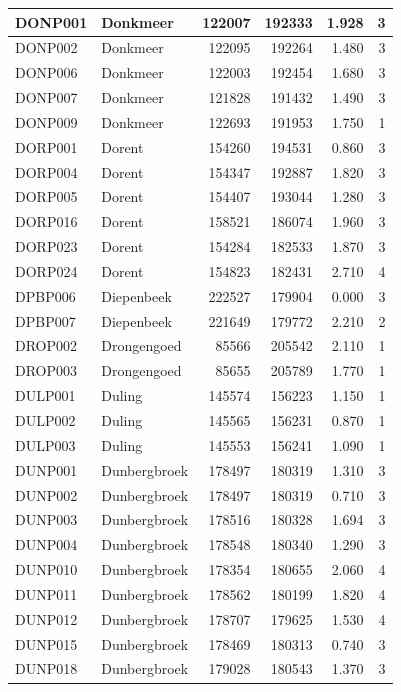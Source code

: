 \documentclass[11pt,]{book}
\begin{document}
\begin{table}
\begin{tabular}[t]{l|l|r|r|r|r}
\hline
DONP001 & Donkmeer & 122007 & 192333 & 1.928 & 3\\
\hline
DONP002 & Donkmeer & 122095 & 192264 & 1.480 & 3\\
\hline
DONP006 & Donkmeer & 122003 & 192454 & 1.680 & 3\\
\hline
DONP007 & Donkmeer & 121828 & 191432 & 1.490 & 3\\
\hline
DONP009 & Donkmeer & 122693 & 191953 & 1.750 & 1\\
\hline
DORP001 & Dorent & 154260 & 194531 & 0.860 & 3\\
\hline
DORP004 & Dorent & 154347 & 192887 & 1.820 & 3\\
\hline
DORP005 & Dorent & 154407 & 193044 & 1.280 & 3\\
\hline
DORP016 & Dorent & 158521 & 186074 & 1.960 & 3\\
\hline
DORP023 & Dorent & 154284 & 182533 & 1.870 & 3\\
\hline
DORP024 & Dorent & 154823 & 182431 & 2.710 & 4\\
\hline
DPBP006 & Diepenbeek & 222527 & 179904 & 0.000 & 3\\
\hline
DPBP007 & Diepenbeek & 221649 & 179772 & 2.210 & 2\\
\hline
DROP002 & Drongengoed & 85566 & 205542 & 2.110 & 1\\
\hline
DROP003 & Drongengoed & 85655 & 205789 & 1.770 & 1\\
\hline
DULP001 & Duling & 145574 & 156223 & 1.150 & 1\\
\hline
DULP002 & Duling & 145565 & 156231 & 0.870 & 1\\
\hline
DULP003 & Duling & 145553 & 156241 & 1.090 & 1\\
\hline
DUNP001 & Dunbergbroek & 178497 & 180319 & 1.310 & 3\\
\hline
DUNP002 & Dunbergbroek & 178497 & 180319 & 0.710 & 3\\
\hline
DUNP003 & Dunbergbroek & 178516 & 180328 & 1.694 & 3\\
\hline
DUNP004 & Dunbergbroek & 178548 & 180340 & 1.290 & 3\\
\hline
DUNP010 & Dunbergbroek & 178354 & 180655 & 2.060 & 4\\
\hline
DUNP011 & Dunbergbroek & 178562 & 180199 & 1.820 & 4\\
\hline
DUNP012 & Dunbergbroek & 178707 & 179625 & 1.530 & 4\\
\hline
DUNP015 & Dunbergbroek & 178469 & 180313 & 0.740 & 3\\
\hline
DUNP018 & Dunbergbroek & 179028 & 180543 & 1.370 & 3\\

\end{tabular}
\end{table}
\end{document}
